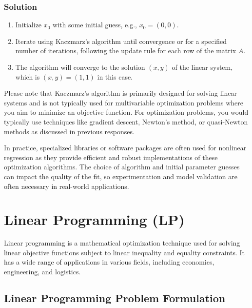 \documentclass[a4paper]{article}
\begin{document}
\subsubsection{Solution}

\begin{enumerate}
    \item Initialize \(x_0\) with some initial guess, e.g., \(x_0 = (0, 0)\).
    
    \item Iterate using Kaczmarz's algorithm until convergence or for a specified number of iterations, following the update rule for each row of the matrix \(A\).
    
    \item The algorithm will converge to the solution \((x, y)\) of the linear system, which is \((x, y) = (1, 1)\) in this case.
\end{enumerate}

Please note that Kaczmarz's algorithm is primarily designed for solving linear systems and is not typically used for multivariable optimization problems where you aim to minimize an objective function. For optimization problems, you would typically use techniques like gradient descent, Newton's method, or quasi-Newton methods as discussed in previous responses.



In practice, specialized libraries or software packages are often used for nonlinear regression as they provide efficient and robust implementations of these optimization algorithms. The choice of algorithm and initial parameter guesses can impact the quality of the fit, so experimentation and model validation are often necessary in real-world applications.

\section{Linear Programming (LP)}

Linear programming is a mathematical optimization technique used for solving linear objective functions subject to linear inequality and equality constraints. It has a wide range of applications in various fields, including economics, engineering, and logistics.

\subsection{Linear Programming Problem Formulation}
\end{document}
